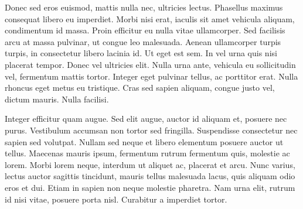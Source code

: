 Donec sed eros euismod, mattis nulla nec, ultricies lectus. Phasellus maximus consequat
libero eu imperdiet. Morbi nisi erat, iaculis sit amet vehicula aliquam, condimentum id
massa. Proin efficitur eu nulla vitae ullamcorper. Sed facilisis arcu at massa pulvinar,
ut congue leo malesuada. Aenean ullamcorper turpis turpis, in consectetur libero lacinia
id. Ut eget est sem. In vel urna quis nisi placerat tempor. Donec vel ultricies elit.
Nulla urna ante, vehicula eu sollicitudin vel, fermentum mattis tortor. Integer eget
pulvinar tellus, ac porttitor erat. Nulla rhoncus eget metus eu tristique. Cras sed
sapien aliquam, congue justo vel, dictum mauris. Nulla facilisi.

Integer efficitur quam augue. Sed elit augue, auctor id aliquam et, posuere nec purus.
Vestibulum accumsan non tortor sed fringilla. Suspendisse consectetur nec sapien sed
volutpat. Nullam sed neque et libero elementum posuere auctor ut tellus. Maecenas mauris
ipsum, fermentum rutrum fermentum quis, molestie ac lorem. Morbi lorem neque, interdum
ut aliquet ac, placerat et arcu. Nunc varius, lectus auctor sagittis tincidunt, mauris
tellus malesuada lacus, quis aliquam odio eros et dui. Etiam in sapien non neque
molestie pharetra. Nam urna elit, rutrum id nisi vitae, posuere porta nisl. Curabitur a
imperdiet tortor.

